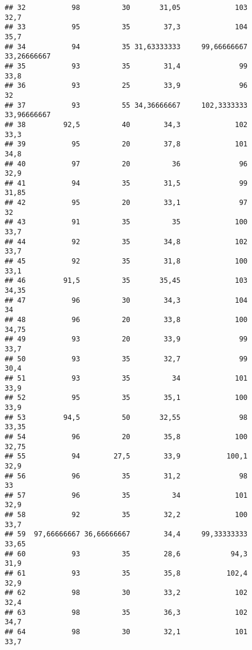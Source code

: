 \documentclass[
]{article}
\begin{document}
\begin{verbatim}
## 32           98          30       31,05             103                 32,7
## 33           95          35        37,3             104                 35,7
## 34           94          35 31,63333333     99,66666667          33,26666667
## 35           93          35        31,4              99                 33,8
## 36           93          25        33,9              96                   32
## 37           93          55 34,36666667     102,3333333          33,96666667
## 38         92,5          40        34,3             102                 33,3
## 39           95          20        37,8             101                 34,8
## 40           97          20          36              96                 32,9
## 41           94          35        31,5              99                31,85
## 42           95          20        33,1              97                   32
## 43           91          35          35             100                 33,7
## 44           92          35        34,8             102                 33,7
## 45           92          35        31,8             100                 33,1
## 46         91,5          35       35,45             103                34,35
## 47           96          30        34,3             104                   34
## 48           96          20        33,8             100                34,75
## 49           93          20        33,9              99                 33,7
## 50           93          35        32,7              99                 30,4
## 51           93          35          34             101                 33,9
## 52           95          35        35,1             100                 33,9
## 53         94,5          50       32,55              98                33,35
## 54           96          20        35,8             100                32,75
## 55           94        27,5        33,9           100,1                 32,9
## 56           96          35        31,2              98                   33
## 57           96          35          34             101                 32,9
## 58           92          35        32,2             100                 33,7
## 59  97,66666667 36,66666667        34,4     99,33333333                33,65
## 60           93          35        28,6            94,3                 31,9
## 61           93          35        35,8           102,4                 32,9
## 62           98          30        33,2             102                 32,4
## 63           98          35        36,3             102                 34,7
## 64           98          30        32,1             101                 33,7

\end{verbatim}
\end{document}
